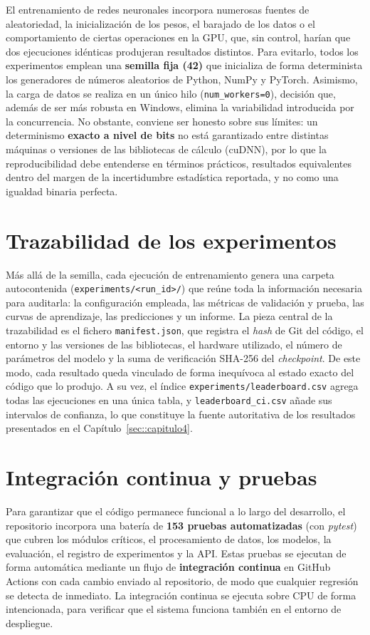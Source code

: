 El entrenamiento de redes neuronales incorpora numerosas fuentes de aleatoriedad, la
inicialización de los pesos, el barajado de los datos o el comportamiento de ciertas
operaciones en la GPU, que, sin control, harían que dos ejecuciones idénticas
produjeran resultados distintos. Para evitarlo, todos los experimentos emplean una
\textbf{semilla fija (42)} que inicializa de forma determinista los generadores de
números aleatorios de Python, NumPy y PyTorch. Asimismo, la carga de datos se realiza en
un único hilo (\texttt{num\_workers=0}), decisión que, además de ser más robusta en
Windows, elimina la variabilidad introducida por la concurrencia. No obstante, conviene
ser honesto sobre sus límites: un determinismo \textbf{exacto a nivel de bits} no está
garantizado entre distintas máquinas o versiones de las bibliotecas de cálculo (cuDNN),
por lo que la reproducibilidad debe entenderse en términos prácticos, resultados
equivalentes dentro del margen de la incertidumbre estadística reportada, y no como una
igualdad binaria perfecta.

\section{Trazabilidad de los experimentos}
\label{sec::repro_trazabilidad}

Más allá de la semilla, cada ejecución de entrenamiento genera una carpeta
autocontenida (\texttt{experiments/<run\_id>/}) que reúne toda la información necesaria
para auditarla: la configuración empleada, las métricas de validación y prueba, las
curvas de aprendizaje, las predicciones y un informe. La pieza central de la
trazabilidad es el fichero \texttt{manifest.json}, que registra el \textit{hash} de Git
del código, el entorno y las versiones de las bibliotecas, el hardware utilizado, el
número de parámetros del modelo y la suma de verificación SHA-256 del
\textit{checkpoint}. De este modo, cada resultado queda vinculado de forma inequívoca al
estado exacto del código que lo produjo. A su vez, el índice
\texttt{experiments/leaderboard.csv} agrega todas las ejecuciones en una única tabla, y
\texttt{leaderboard\_ci.csv} añade sus intervalos de confianza, lo que constituye la
fuente autoritativa de los resultados presentados en el Capítulo~\ref{sec::capitulo4}.

\section{Integración continua y pruebas}
\label{sec::repro_ci}

Para garantizar que el código permanece funcional a lo largo del desarrollo, el
repositorio incorpora una batería de \textbf{153 pruebas automatizadas} (con
\textit{pytest}) que cubren los módulos críticos, el procesamiento de datos, los
modelos, la evaluación, el registro de experimentos y la API. Estas pruebas se ejecutan
de forma automática mediante un flujo de \textbf{integración continua} en GitHub Actions
con cada cambio enviado al repositorio, de modo que cualquier regresión se detecta de
inmediato. La integración continua se ejecuta sobre CPU de forma intencionada, para
verificar que el sistema funciona también en el entorno de despliegue.

